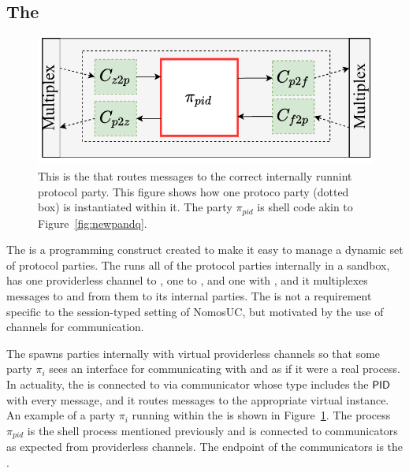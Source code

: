 \subsection{The \partywrapper}
\begin{figure}
	\centering
	\includegraphics[scale=0.5]{figures/singleshellmultiplex.pdf}
	\caption{This is the \partywrapper that routes messages to the correct internally runnint protocol party. This figure shows how one protoco party (dotted box) is instantiated within it. The party $\pi_{pid}$ is shell code akin to Figure~\ref{fig:newpandq}.}%
	\label{fig:singlemultiplex}
	\vspace{-3mm}
\end{figure}
The \partywrapper is a programming construct created to make it easy to manage a dynamic set of protocol parties. 
The \partywrapper runs all of the protocol parties internally in a sandbox, has one providerless channel to \Z, one to \A, and one with \F, and it multiplexes messages to and from them to its internal parties. 
The \partywrapper is not a requirement specific to the session-typed setting of NomosUC, but motivated by the use of channels for communication.

The \partywrapper spawns parties internally with virtual providerless channels so that some party $\pi_i$ sees an interface for communicating with \F and \Z as if it were a real process.
In actuality, the \partywrapper is connected to \Z via communicator whose type includes the $\mathsf{PID}$ with every message, and it routes messages to the appropriate virtual instance.
An example of a party $\pi_i$ running within the \partywrapper is shown in Figure~\ref{fig:singlemultiplex}. The process $\pi_{pid}$ is the shell process mentioned previously and is connected to communicators as expected from providerless channels. The endpoint of the communicators is the \partywrapper.  

